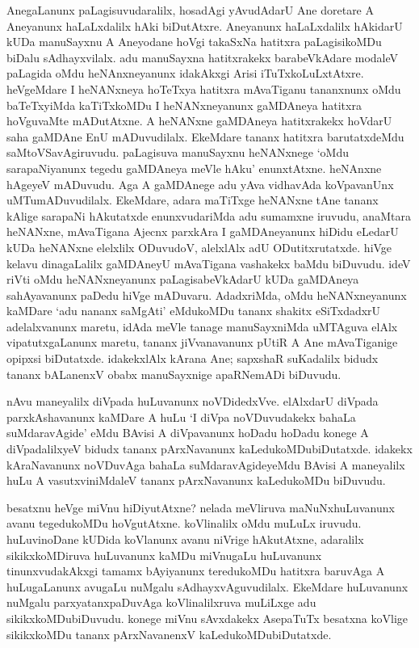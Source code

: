 AnegaLanunx paLagisuvudaralilx, hosadAgi yAvudAdarU Ane doretare A Aneyanunx haLaLxdalilx hAki biDutAtxre. Aneyanunx haLaLxdalilx hAkidarU kUDa manuSayxnu A Aneyodane hoVgi takaSxNa hatitxra paLagisikoMDu biDalu sAdhayxvilalx. adu manuSayxna hatitxrakekx barabeVkAdare modaleV paLagida oMdu heNAnxneyanunx idakAkxgi Arisi iTuTxkoLuLxtAtxre. heVgeMdare I heNANxneya hoTeTxya hatitxra mAvaTiganu tananxnunx oMdu baTeTxyiMda kaTiTxkoMDu I heNANxneyanunx gaMDAneya hatitxra hoVguvaMte mADutAtxne. A heNANxne gaMDAneya hatitxrakekx hoVdarU saha gaMDAne EnU mADuvudilalx. EkeMdare tananx hatitxra barutatxdeMdu saMtoVSavAgiruvudu. paLagisuva manuSayxnu heNANxnege `oMdu sarapaNiyanunx tegedu gaMDAneya meVle hAku' enunxtAtxne. heNAnxne hAgeyeV mADuvudu. Aga A gaMDAnege adu yAva vidhavAda koVpavanUnx uMTumADuvudilalx. EkeMdare, adara maTiTxge heNANxne tAne tananx kAlige sarapaNi hAkutatxde enunxvudariMda adu sumamxne iruvudu, anaMtara heNANxne, mAvaTigana Ajecnx parxkAra I gaMDAneyanunx hiDidu eLedarU kUDa heNANxne elelxlilx ODuvudoV, alelxlAlx adU ODutitxrutatxde. hiVge kelavu dinagaLalilx gaMDAneyU mAvaTigana vashakekx baMdu biDuvudu. ideV riVti oMdu heNANxneyanunx paLagisabeVkAdarU kUDa gaMDAneya sahAyavanunx paDedu hiVge mADuvaru. AdadxriMda, oMdu heNANxneyanunx kaMDare `adu nananx saMgAti' eMdukoMDu tananx shakitx eSiTxdadxrU adelalxvanunx maretu, idAda meVle tanage manuSayxniMda uMTAguva elAlx vipatutxgaLanunx maretu, tananx jiVvanavanunx pUtiR A Ane mAvaTiganige opipxsi biDutatxde. idakekxlAlx kArana Ane; sapxshaR suKadalilx bidudx tananx bALanenxV obabx manuSayxnige apaRNemADi biDuvudu.

nAvu maneyalilx diVpada huLuvanunx noVDidedxVve. elAlxdarU diVpada parxkAshavanunx kaMDare A huLu `I diVpa noVDuvudakekx bahaLa suMdaravAgide' eMdu BAvisi A diVpavanunx hoDadu hoDadu konege A diVpadalilxyeV bidudx tananx pArxNavanunx kaLedukoMDubiDutatxde. idakekx kAraNavanunx noVDuvAga bahaLa suMdaravAgideyeMdu BAvisi A maneyalilx huLu A vasutxviniMdaleV tananx pArxNavanunx kaLedukoMDu biDuvudu.

besatxnu heVge miVnu hiDiyutAtxne? nelada meVliruva maNuNxhuLuvanunx avanu tegedukoMDu hoVgutAtxne. koVlinalilx oMdu muLuLx iruvudu. huLuvinoDane kUDida koVlanunx avanu niVrige hAkutAtxne, adaralilx sikikxkoMDiruva huLuvanunx kaMDu miVnugaLu huLuvanunx tinunxvudakAkxgi tamamx bAyiyanunx teredukoMDu hatitxra baruvAga A huLugaLanunx avugaLu nuMgalu sAdhayxvAguvudilalx. EkeMdare huLuvanunx nuMgalu parxyatanxpaDuvAga koVlinalilxruva muLiLxge adu sikikxkoMDubiDuvudu. konege miVnu sAvxdakekx AsepaTuTx besatxna koVlige sikikxkoMDu tananx pArxNavanenxV kaLedukoMDubiDutatxde.

